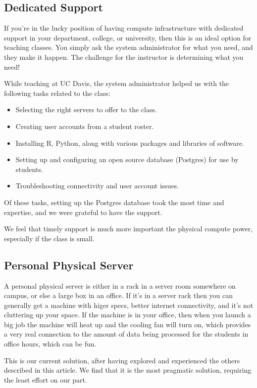 \documentclass[12pt]{article}
\begin{document}
\subsection{Dedicated Support}

If you're in the lucky position of having compute infrastructure with dedicated support in your department, college, or university, then this is an ideal option for teaching classes.
You simply ask the system administrator for what you need, and they make it happen.
The challenge for the instructor is determining what you need!

While teaching at UC Davis, the system administrator helped us with the following tasks related to the class:
\begin{itemize}
\item Selecting the right servers to offer to the class.
\item Creating user accounts from a student roster.
\item Installing R, Python, along with various packages and libraries of software.
\item Setting up and configuring an open source database (Postgres) for use by students.
\item Troubleshooting connectivity and user account issues.
\end{itemize}
Of these tasks, setting up the Postgres database took the most time and expertise, and we were grateful to have the support.

We feel that timely support is much more important the physical compute power, especially if the class is small.

\subsection{Personal Physical Server}

A personal physical server is either in a rack in a server room somewhere on campus, or else a large box in an office.
If it's in a server rack then you can generally get a machine with higer specs, better internet connectivity, and it's not cluttering up your space.
If the machine is in your office, then when you launch a big job the machine will heat up and the cooling fan will turn on, which provides a very real connection to the amount of data being processed for the students in office hours, which can be fun.

This is our current solution, after having explored and experienced the others described in this article.
We find that it is the most pragmatic solution, requiring the least effort on our part.
\end{document}
